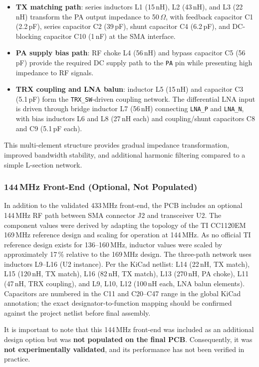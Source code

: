 \begin{itemize}
    \item \textbf{TX matching path}: series inductors L1 (15\,nH), L2 (43\,nH), and L3 (22\,nH) transform the PA output impedance to 50\,$\Omega$, with feedback capacitor C1 (2.2\,pF), series capacitor C2 (39\,pF), shunt capacitor C4 (6.2\,pF), and DC-blocking capacitor C10 (1\,nF) at the SMA interface.
    \item \textbf{PA supply bias path}: RF choke L4 (56\,nH) and bypass capacitor C5 (56\,pF) provide the required DC supply path to the \texttt{PA} pin while presenting high impedance to RF signals.
    \item \textbf{TRX coupling and LNA balun}: inductor L5 (15\,nH) and capacitor C3 (5.1\,pF) form the \texttt{TRX\_SW}-driven coupling network. The differential LNA input is driven through bridge inductor L7 (56\,nH) connecting \texttt{LNA\_P} and \texttt{LNA\_N}, with bias inductors L6 and L8 (27\,nH each) and coupling/shunt capacitors C8 and C9 (5.1\,pF each).
\end{itemize}

This multi-element structure provides gradual impedance transformation, improved bandwidth stability, and additional harmonic filtering compared to a simple L-section network.

\subsubsection{144\,MHz Front-End (Optional, Not Populated)}

In addition to the validated 433\,MHz front-end, the PCB includes an optional 144\,MHz RF path between SMA connector J2 and transceiver U2. The component values were derived by adapting the topology of the TI CC1120EM 169\,MHz reference design \cite{tidr220} and scaling for operation at 144\,MHz. As no official TI reference design exists for 136--160\,MHz, inductor values were scaled by approximately 17\,\% relative to the 169\,MHz design. The three-path network uses inductors L9--L16 (U2 instance). Per the KiCad netlist: L14 (22\,nH, TX match), L15 (120\,nH, TX match), L16 (82\,nH, TX match), L13 (270\,nH, PA choke), L11 (47\,nH, TRX coupling), and L9, L10, L12 (100\,nH each, LNA balun elements). Capacitors are numbered in the C11 and C20--C47 range in the global KiCad annotation; the exact designator-to-function mapping should be confirmed against the project netlist before final assembly.

It is important to note that this 144\,MHz front-end was included as an additional design option but was \textbf{not populated on the final PCB}. Consequently, it was \textbf{not experimentally validated}, and its performance has not been verified in practice.

